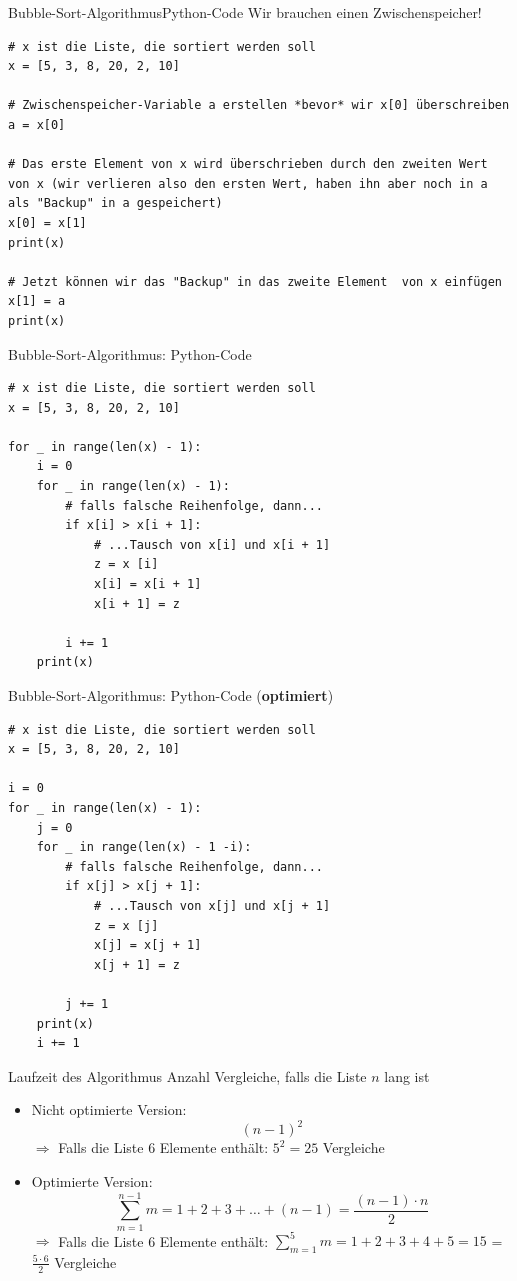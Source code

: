 \begin{frame}[fragile]{Bubble-Sort-Algorithmus}{Python-Code}
	Wir brauchen einen Zwischenspeicher!
	\begin{lstlisting}[basicstyle=\footnotesize\ttfamily]
# x ist die Liste, die sortiert werden soll
x = [5, 3, 8, 20, 2, 10]

# Zwischenspeicher-Variable a erstellen *bevor* wir x[0] überschreiben
a = x[0] 

# Das erste Element von x wird überschrieben durch den zweiten Wert von x (wir verlieren also den ersten Wert, haben ihn aber noch in a als "Backup" in a gespeichert)
x[0] = x[1]
print(x)

# Jetzt können wir das "Backup" in das zweite Element  von x einfügen
x[1] = a
print(x)
	\end{lstlisting}
\end{frame}

\begin{frame}[fragile]{Bubble-Sort-Algorithmus: Python-Code}
	\begin{lstlisting}[basicstyle=\small\ttfamily]
# x ist die Liste, die sortiert werden soll
x = [5, 3, 8, 20, 2, 10]

for _ in range(len(x) - 1):
    i = 0
	for _ in range(len(x) - 1):
    	# falls falsche Reihenfolge, dann...
        if x[i] > x[i + 1]:
			# ...Tausch von x[i] und x[i + 1]
            z = x [i]
            x[i] = x[i + 1]
            x[i + 1] = z

        i += 1
    print(x)
	\end{lstlisting}
\end{frame}

\begin{frame}[fragile]{Bubble-Sort-Algorithmus: Python-Code (\textbf{optimiert})}
	\begin{lstlisting}[basicstyle=\small\ttfamily]
# x ist die Liste, die sortiert werden soll
x = [5, 3, 8, 20, 2, 10]

i = 0
for _ in range(len(x) - 1):
    j = 0
	for _ in range(len(x) - 1 -i):
    	# falls falsche Reihenfolge, dann...
        if x[j] > x[j + 1]:
			# ...Tausch von x[j] und x[j + 1]
            z = x [j]
            x[j] = x[j + 1]
            x[j + 1] = z

        j += 1
    print(x)
	i += 1
	\end{lstlisting}
\end{frame}

\begin{frame}[fragile]{Laufzeit des Algorithmus}
	Anzahl Vergleiche, falls die Liste $n$ lang ist
	\begin{itemize}
		\item \pause Nicht optimierte Version:
		      \[(n-1)^2\]
		      \pause $\Rightarrow$ Falls die Liste 6 Elemente enthält:  $5^2 = 25$ Vergleiche
		\item \pause Optimierte Version:
		      \[\sum_{m=1}^{n-1}m = 1 + 2 + 3 + \dots + (n-1) = \frac{(n-1) \cdot n}{2}\]
		      \pause $\Rightarrow$ Falls die Liste 6 Elemente enthält: $\displaystyle\sum_{m=1}^{5}m = 1 + 2 + 3 + 4 + 5 = 15$ = $\frac{5 \cdot 6}{2}$ Vergleiche
	\end{itemize}
\end{frame}


